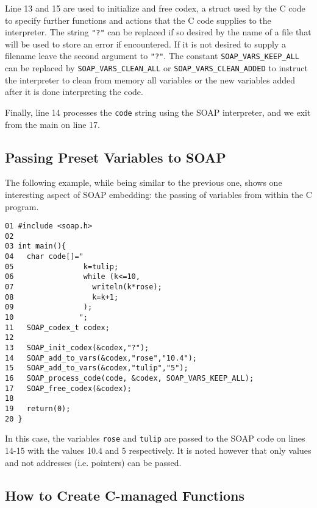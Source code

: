 \documentclass{warpdoc}
\begin{document}
Line 13 and 15 are used to initialize and free codex, a struct used by
the C code to specify further functions and actions
that the C code  supplies to the interpreter. The string \verb|"?"| can be replaced if so desired by 
the name of a file that will be used to store an error if encountered. If it is
not desired to supply a filename leave the second argument to \verb|"?"|. The constant \verb|SOAP_VARS_KEEP_ALL|
can be replaced by \verb|SOAP_VARS_CLEAN_ALL| or \verb|SOAP_VARS_CLEAN_ADDED| to instruct the interpreter to
clean from memory all variables or the new variables added after it is done interpreting the
code.

Finally, line 14 processes the \verb|code| string using the SOAP interpreter,
and we exit from the main on line 17.




\subsection{Passing Preset Variables to SOAP}

The following example, while being similar to the previous one, shows
one interesting aspect of SOAP embedding: the passing of variables from
within the C program.
%
\begin{verbatim}
01 #include <soap.h>
02
03 int main(){
04   char code[]="
05                k=tulip;
06                while (k<=10,
07                  writeln(k*rose);
08                  k=k+1;
09                );
10               ";
11   SOAP_codex_t codex;
12
13   SOAP_init_codex(&codex,"?");
14   SOAP_add_to_vars(&codex,"rose","10.4");
15   SOAP_add_to_vars(&codex,"tulip","5");
16   SOAP_process_code(code, &codex, SOAP_VARS_KEEP_ALL);
17   SOAP_free_codex(&codex);
18
19   return(0);
20 }
\end{verbatim}
%
In this case, the variables \verb|rose| and
\verb|tulip| are passed to the SOAP code on lines 14-15 with the values 10.4 and 5
respectively. It is noted however that only values and not addresses
(i.e. pointers) can be passed.





\subsection{How to Create C-managed Functions}
\end{document}
